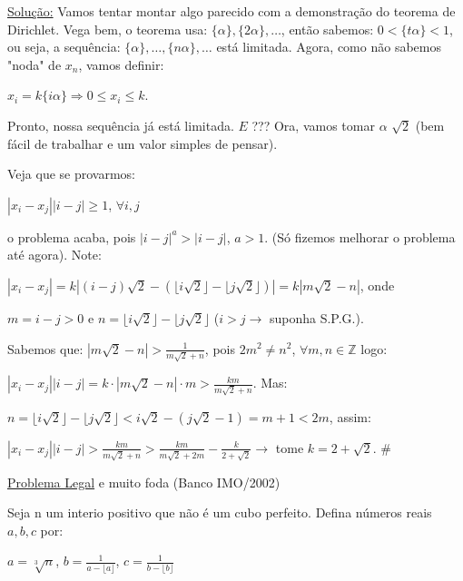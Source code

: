 \documentclass[a4paper,12pt]{article}
\renewcommand{\leq}{\ensuremath{\leqslant}}
\renewcommand{\geq}{\ensuremath{\geqslant}}
\theoremstyle{plain} %
\theoremstyle{definition} %
\theoremstyle{remark} %
\newcommand*\circled[1]{\tikz[baseline=(char.base)]{
		\node[shape=circle,draw,inner sep=2pt] (char) {#1};}}%
\begin{document}
	\begin{framed}
		\underline{Solu\c{c}\~ao:} Vamos tentar montar algo parecido com a demonstra\c{c}\~ao do teorema de Dirichlet. Vega bem, o teorema usa: $\{\alpha\}, \{2\alpha\}, \dotso$, ent\~ao sabemos: $0<\{t\alpha\}<1$, ou seja, a sequ\^encia: $\{\alpha\}, \dotso, \{n\alpha\}, \dotso$ est\'a limitada. Agora, como n\~ao sabemos "noda" de $x_n$, vamos definir: 
		
		\begin{center}
			$x_i=k\{i\alpha\}\Rightarrow 0\leq x_i\leq k$.
		\end{center}
		
		Pronto, nossa sequ\^encia j\'a est\'a limitada. $E$ \circled{$\alpha$} ??? Ora, vamos tomar \underline{$\alpha$} $\sqrt{2}$ (bem f\'acil de trabalhar e um valor simples de pensar). 
		
		Veja que se provarmos:
		
		\begin{center}
			$|x_i-x_j| |i-j|\geq 1$, $\forall i,j$
		\end{center}
		
		o problema acaba, pois $|i-j|^a>|i-j|$, $a>1$. (S\'o fizemos melhorar o problema at\'e agora). Note:
		
		$|x_i-x_j|=k|(i-j)\sqrt{2}-(\lfloor i\sqrt{2} \rfloor - \lfloor j\sqrt{2} \rfloor)|=k|m\sqrt{2}-n|$, onde 
		
		$m=i-j>0$ e $n=\lfloor i\sqrt{2} \rfloor - \lfloor j\sqrt{2} \rfloor$ ($i>j\rightarrow$ suponha S.P.G.).
		
		Sabemos que: $|m\sqrt{2}-n|>\frac{1}{m\sqrt{2}+n}$, pois $2m^2\neq n^2$, $\forall m,n \in \mathds{Z}$ logo:
		
		$|x_i-x_j| |i-j|= k\cdot|m\sqrt{2}-n|\cdot m>\frac{km}{m\sqrt{2}+n}$. Mas:
		
		$n=\lfloor i\sqrt{2} \rfloor - \lfloor j\sqrt{2} \rfloor<i\sqrt{2}-(j\sqrt{2}-1)=m+1<2m$, assim:
		
		$|x_i-x_j| |i-j|>\frac{km}{m\sqrt{2}+n}>\frac{km}{m\sqrt{2}+2m}-\frac{k}{2+\sqrt{2}}\rightarrow$ tome $k=2+\sqrt{2}$. \huge\#
		
		\normalsize
	\end{framed}
	
	\vspace{2ex}\underline{Problema Legal} e muito foda (Banco IMO/2002)
	
	Seja n um interio positivo que n\~ao \'e um cubo perfeito. Defina n\'umeros reais $a, b, c$ por:
	
	\begin{center}
		$a=\sqrt[3]{n}$, $b=\frac{1}{a-\lfloor a\rfloor}$, $c=\frac{1}{b-\lfloor b\rfloor}$
	\end{center}
	
\end{document}
